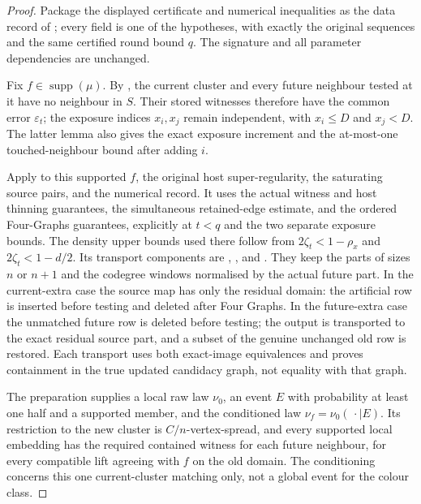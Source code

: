 \begin{proof}
Package the displayed certificate and numerical inequalities as the data
record of ; every field is one of the
hypotheses, with exactly the original sequences and the same certified round
bound \(q\). The signature and all parameter dependencies are unchanged.

Fix \(f\in\operatorname{supp}(\mu)\). By
, the current cluster and every
future neighbour tested at it have no neighbour in \(S\). Their stored
witnesses therefore have the common error \(\varepsilon_t\); the exposure
indices \(x_i,x_j\) remain independent, with \(x_i\le D\) and \(x_j<D\).
The latter lemma also gives the exact exposure increment and the at-most-one
touched-neighbour bound after adding \(i\).

Apply  to this supported \(f\),
the original host super-regularity, the saturating source pairs, and the
numerical record. It uses the actual witness and host thinning guarantees,
the simultaneous retained-edge estimate, and the ordered Four-Graphs
guarantees, explicitly at \(t<q\) and the two separate exposure bounds.
The density upper bounds used there follow from
\(2\zeta_t<1-\rho_x\) and \(2\zeta_t<1-d/2\).
Its transport components are
,
, and
.
They keep the parts of sizes \(n\) or \(n+1\) and the codegree windows
normalised by the actual future part.
In the current-extra case the source map has only the residual domain:
the artificial row is inserted before testing and deleted after Four
Graphs. In the future-extra case the unmatched future row is deleted
before testing; the output is transported to the exact residual source
part, and a subset of the genuine unchanged old row is restored.
Each transport uses both exact-image equivalences and proves containment
in the true updated candidacy graph, not equality with that graph.

The preparation supplies a local raw law \(\nu_0\), an event \(E\) with
probability at least one half and a supported member, and the conditioned
law \(\nu_f=\nu_0(\,\cdot\mid E)\).
Its restriction to the new cluster is \(C/n\)-vertex-spread, and every
supported local embedding has the required contained witness for each
future neighbour, for every compatible lift agreeing with \(f\) on the
old domain. The conditioning concerns this one current-cluster matching
only, not a global event for the colour class.


\end{proof}
